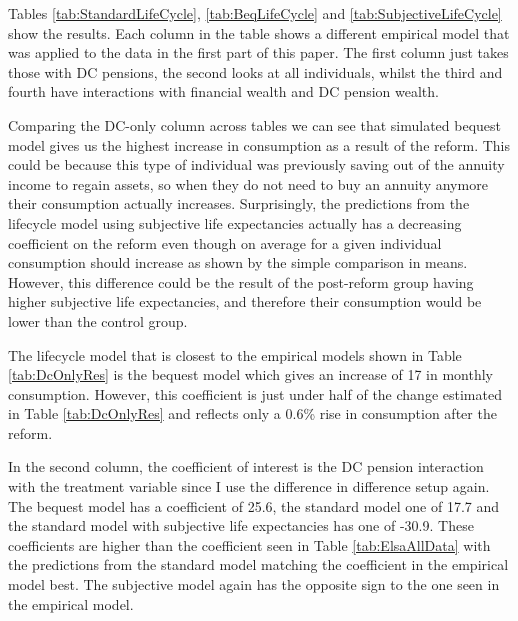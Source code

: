 \documentclass[12pt]{article}
\begin{document}
\begin{landscape}
    
\end{landscape}

\begin{landscape}
    
\end{landscape}

\begin{landscape}
    
\end{landscape}


Tables \ref{tab:StandardLifeCycle}, \ref{tab:BeqLifeCycle} and
\ref{tab:SubjectiveLifeCycle} show the results. Each column in the table shows a
different empirical model that was applied to the data in the first part of this
paper. The first column just takes those with DC pensions, the second looks at
all individuals, whilst the third and fourth have interactions with financial
wealth and DC pension wealth.

Comparing the DC-only column across tables we can see that simulated bequest
model gives us the highest increase in consumption as a result of the reform.
This could be because this type of individual was previously saving out of the
annuity income to regain assets, so when they do not need to buy an annuity
anymore their consumption actually increases. Surprisingly, the predictions from
the lifecycle model using subjective life expectancies actually has a decreasing
coefficient on the reform even though on average for a given individual
consumption should increase as shown by the simple comparison in means. However,
this difference could be the result of the post-reform group having higher
subjective life expectancies, and therefore their consumption would be lower
than the control group.

The lifecycle model that is closest to the empirical models shown in Table
\ref{tab:DcOnlyRes} is the bequest model which gives an increase of 17 in
monthly consumption. However, this coefficient is just under half of the change
estimated in Table \ref{tab:DcOnlyRes} and reflects only a 0.6\% rise in
consumption after the reform.

In the second column, the coefficient of interest is the DC pension interaction
with the treatment variable since I use the difference in difference setup
again. The bequest model has a coefficient of 25.6, the standard model one of
17.7 and the standard model with subjective life expectancies has one of -30.9.
These coefficients are higher than the coefficient seen in Table
\ref{tab:ElsaAllData} with the predictions from the standard model matching the
coefficient in the empirical model best. The subjective model again has the
opposite sign to the one seen in the empirical model.
\end{document}
